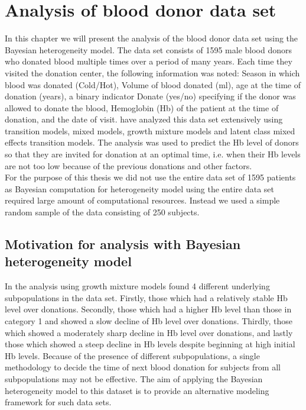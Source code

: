
\chapter{Analysis of blood donor data set}
\label{ch : blood_donor}
 
 In this chapter we will present the analysis of the blood donor data set \citep{nasserinejad_prevalence_2015} using the Bayesian heterogeneity model. The data set consists of 1595 male blood donors who donated blood multiple times over a period of many years. Each time they visited the donation center, the following information was noted: Season in which blood was donated (Cold/Hot), Volume of blood donated (ml), age at the time of donation (years), a binary indicator Donate (yes/no) specifying if the donor was allowed to donate the blood, Hemoglobin (Hb) of the patient at the time of donation, and the date of visit. \citet{nasserinejad_predicting_2013,nasserinejad_prevalence_2015,nasserinejad_prediction_2016} have analyzed this data set extensively using transition models, mixed models, growth mixture models and latent class mixed effects transition models. The analysis was used to predict the Hb level of donors so that they are invited for donation at an optimal time, i.e. when their Hb levels are not too low because of the previous donations and other factors.\\

 For the purpose of this thesis we did not use the entire data set of 1595 patients as Bayesian computation for heterogeneity model using the entire data set required large amount of computational resources. Instead we used a simple random sample of the data consisting of 250 subjects.

\section{Motivation for analysis with Bayesian heterogeneity model}
 In the analysis using growth mixture models \citet{nasserinejad_prevalence_2015} found 4 different underlying subpopulations in the data set. Firstly, those which had a relatively stable Hb level over donations. Secondly, those which had a higher Hb level than those in category 1 and showed a slow decline of Hb level over donations. Thirdly, those which showed a moderately sharp decline in Hb level over donations, and lastly those which showed a steep decline in Hb levels despite beginning at high initial Hb levels. Because of the presence of different subpopulations, a single methodology to decide the time of next blood donation for subjects from all subpopulations may not be effective. The aim of applying the Bayesian heterogeneity model to this dataset is to provide an alternative modeling framework for such data sets.

